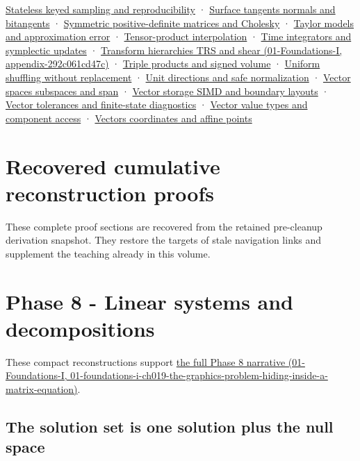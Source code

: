 \hyperref[appendix-daaf25bfd3a0]{Stateless keyed sampling and reproducibility} · \hyperref[appendix-e31893dec985]{Surface tangents normals and bitangents} · \hyperref[appendix-50d2ea3c9b26]{Symmetric positive-definite matrices and Cholesky} · \hyperref[appendix-32f39e9a3738]{Taylor models and approximation error} · \hyperref[appendix-0a09b6dfdc86]{Tensor-product interpolation} · \hyperref[appendix-8f96f9c4d5bc]{Time integrators and symplectic updates} · \href{../01-Foundations-I/main.pdf\#nameddest=appendix-292c061cd47c}{Transform hierarchies TRS and shear (01-Foundations-I, appendix-292c061cd47c)} · \hyperref[appendix-5caa058bd9c7]{Triple products and signed volume} · \hyperref[appendix-184fcc411663]{Uniform shuffling without replacement} · \hyperref[appendix-f744e41b95b4]{Unit directions and safe normalization} · \hyperref[appendix-173b52c063ae]{Vector spaces subspaces and span} · \hyperref[appendix-26bf6bf2fb8b]{Vector storage SIMD and boundary layouts} · \hyperref[appendix-b5b83329215b]{Vector tolerances and finite-state diagnostics} · \hyperref[appendix-37a39984ba66]{Vector value types and component access} · \hyperref[appendix-0659864c0aa3]{Vectors coordinates and affine points}

\section{Recovered cumulative reconstruction proofs}\label{02-foundations-ii-ch039-recovered-cumulative-reconstruction-proofs}

These complete proof sections are recovered from the retained pre-cleanup derivation snapshot. They restore the targets of stale navigation links and supplement the teaching already in this volume.

\section{Phase 8 - Linear systems and decompositions}\label{02-foundations-ii-ch039-phase-8---linear-systems-and-decompositions}

These compact reconstructions support \href{../01-Foundations-I/main.pdf\#nameddest=01-foundations-i-ch019-the-graphics-problem-hiding-inside-a-matrix-equation}{the full Phase 8 narrative (01-Foundations-I, 01-foundations-i-ch019-the-graphics-problem-hiding-inside-a-matrix-equation)}.

\subsection{The solution set is one solution plus the null space}\label{02-foundations-ii-ch039-the-solution-set-is-one-solution-plus-the-null-space}

